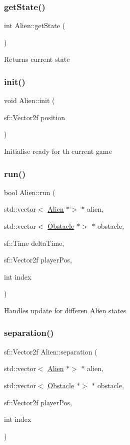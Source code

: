 \subsubsection{\texorpdfstring{get\+State()}{getState()}}
{\footnotesize\ttfamily int Alien\+::get\+State (\begin{DoxyParamCaption}{ }\end{DoxyParamCaption})}

Returns current state \mbox{\label{class_alien_a516b6245841735741f287b38c20b8853}} 
\subsubsection{\texorpdfstring{init()}{init()}}
{\footnotesize\ttfamily void Alien\+::init (\begin{DoxyParamCaption}\item[{sf\+::\+Vector2f}]{position }\end{DoxyParamCaption})}

Initialise ready for th current game \mbox{\label{class_alien_a324df6263d05f4cd623b3fc14b76afc3}} 
\subsubsection{\texorpdfstring{run()}{run()}}
{\footnotesize\ttfamily bool Alien\+::run (\begin{DoxyParamCaption}\item[{std\+::vector$<$ \hyperlink{class_alien}{Alien} $\ast$$>$ $\ast$}]{alien,  }\item[{std\+::vector$<$ \hyperlink{class_obstacle}{Obstacle} $\ast$$>$ $\ast$}]{obstacle,  }\item[{sf\+::\+Time}]{delta\+Time,  }\item[{sf\+::\+Vector2f}]{player\+Pos,  }\item[{int}]{index }\end{DoxyParamCaption})}

Handles update for differen \hyperlink{class_alien}{Alien} states \mbox{\label{class_alien_a9eaa70b12751c0fb89f23520c2a438f3}} 
\subsubsection{\texorpdfstring{separation()}{separation()}}
{\footnotesize\ttfamily sf\+::\+Vector2f Alien\+::separation (\begin{DoxyParamCaption}\item[{std\+::vector$<$ \hyperlink{class_alien}{Alien} $\ast$$>$ $\ast$}]{alien,  }\item[{std\+::vector$<$ \hyperlink{class_obstacle}{Obstacle} $\ast$$>$ $\ast$}]{obstacle,  }\item[{sf\+::\+Vector2f}]{player\+Pos,  }\item[{int}]{index }\end{DoxyParamCaption})}

